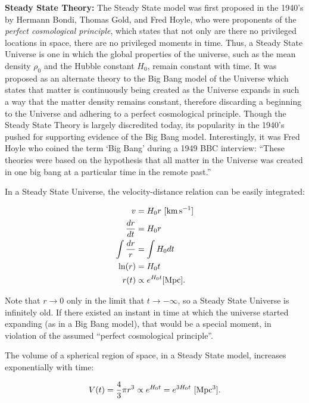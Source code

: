\documentclass[a4paper,11pt]{article}
\begin{document}
{\noindent}\textbf{Steady State Theory:} The Steady State model was first proposed in the 1940's by Hermann Bondi, Thomas Gold, and Fred Hoyle, who were proponents of the \textit{perfect cosmological principle}, which states that not only are there no privileged locations in space, there are no privileged moments in time. Thus, a Steady State Universe is one in which the global properties of the universe, such as the mean density $\rho_0$ and the Hubble constant $H_0$, remain constant with time. It was proposed as an alternate theory to the Big Bang model of the Universe which states that matter is continuously being created as the Universe expands in such a way that the matter density remains constant, therefore discarding a beginning to the Universe and adhering to a perfect cosmological principle. Though the Steady State Theory is largely discredited today, its popularity in the 1940's pushed for supporting evidence of the Big Bang model. Interestingly, it was Fred Hoyle who coined the term `Big Bang' during a 1949 BBC interview: ``These theories were based on the hypothesis that all matter in the Universe was created in one big bang at a particular time in the remote past.''

{\noindent}In a Steady State Universe, the velocity-distance relation can be easily integrated:

\begin{align*}
    v &= H_0r ~ [{\rm km\,s^{-1}}]\\
    \frac{dr}{dt} &= H_0r \\
    \int \frac{dr}{r} &= \int H_0 dt \\
    \ln (r) &= H_0t \\
    r(t) &\propto e^{H_0t} [{\rm Mpc}].
\end{align*}

{\noindent}Note that $r \rightarrow 0$ only in the limit that $t \rightarrow -\infty$, so a Steady State Universe is infinitely old. If there existed an instant in time at which the universe started expanding (as in a Big Bang model), that would be a special moment, in violation of the assumed ``perfect cosmological principle''. 

{\noindent}The volume of a spherical region of space, in a Steady State model, increases exponentially with time:

\begin{align*}
    V(t) = \frac{4}{3}\pi r^3 \propto e^{H_0t} = e^{3H_0t} ~ [{\rm Mpc^3}].
\end{align*}
\end{document}
